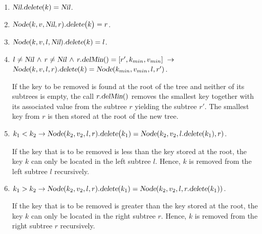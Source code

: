 \begin{enumerate}
\item $\textsl{Nil}.\textsl{delete}(k) = \textsl{Nil}$.
\item $\textsl{Node}(k,v,\textsl{Nil},r).\textsl{delete}\bigl(k\bigr) = r$.
\item $\textsl{Node}(k,v,l,\textsl{Nil}).\textsl{delete}(k) = l$.
\item $l \not= \textsl{Nil} \,\wedge\, r \not= \textsl{Nil} \,\wedge\, r.\textsl{delMin}() = [r',k_{min}, v_{min}]  \;\rightarrow$ \\[0.1cm]
      \hspace*{1.3cm}
      $\textsl{Node}(k,v,l,r).\textsl{delete}(k) = \textsl{Node}(k_{min},v_{min},l,r')$.
      
      If the key to be removed is found at the root of the tree and neither of its subtrees is
      empty, the call  $r\mathtt{.}\textsl{delMin}()$ removes the smallest key together with its
      associated value from the subtree $r$ yielding the subtree $r'$.
      The smallest key from $r$ is then stored at the root of the new tree.

\item $k_1 < k_2 \rightarrow \textsl{Node}(k_2,v_2,l,r).\textsl{delete}\bigl(k_1) = 
       \textsl{Node}(k_2,v_2,l.\textsl{delete}(k_1),r)$.

       If the key that is to be removed is less than the key stored at the root, the key $k$ can only be
       located in the left subtree $l$.  Hence, $k$ is removed from the left subtree $l$ recursively.
\item $k_1 > k_2 \rightarrow \textsl{Node}(k_2,v_2,l,r).\textsl{delete}(k_1) = 
       \textsl{Node}(k_2,v_2,l,r.\textsl{delete}(k_1))$.

       If the key that is to be removed is greater than the key stored at the root, the key $k$ can only be
       located in the right subtree $r$.  Hence, $k$ is removed from the right subtree $r$ recursively.
\end{enumerate}

